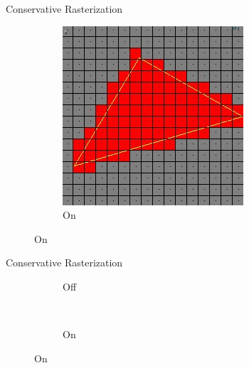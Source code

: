\documentclass[10pt]{beamer}
\begin{document}
{\begin{frame}{Conservative Rasterization}
\begin{figure}
\begin{subfigure}[t]{0.475\textwidth}
      \includegraphics[width=\textwidth]{conservativeraster_on}
      \caption*{On}
    \end{subfigure}
  \end{figure}
\end{frame}}

\begin{frame}{Conservative Rasterization}

  \begin{figure}
    \begin{subfigure}[t]{0.475\textwidth}
      \caption*{Off}
    \end{subfigure}
    ~
    \begin{subfigure}[t]{0.475\textwidth}
      \caption*{On}
    \end{subfigure}
  \end{figure}
\end{frame}
\end{document}
